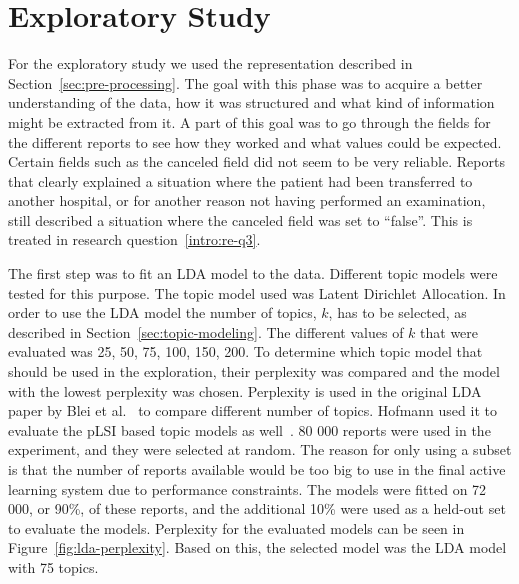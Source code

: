 \section{Exploratory Study}\label{sec:exploratory-study}

For the exploratory study we used the representation described in Section~\ref{sec:pre-processing}.
The goal with this phase was to acquire a better understanding of the data, how it was structured and what kind of information might be extracted from it.
A part of this goal was to go through the fields for the different reports to see how they worked and what values could be expected.
Certain fields such as the canceled field did not seem to be very reliable. 
Reports that clearly explained a situation where the patient had been transferred to another hospital, or for another reason not having performed an examination, still described a situation where the canceled field was set to ``false''.
This is treated in research question~\ref{intro:re-q3}.

The first step was to fit an LDA model to the data.
Different topic models were tested for this purpose.
The topic model used was Latent Dirichlet Allocation.
In order to use the LDA model the number of topics, $k$, has to be selected, as described in Section~\ref{sec:topic-modeling}.
The different values of $k$ that were evaluated was 25, 50, 75, 100, 150, 200.
To determine which topic model that should be used in the exploration, their perplexity was compared and the model with the lowest perplexity was chosen.
Perplexity is used in the original LDA paper by Blei et al\@.~\cite{blei2003latent} to compare different number of topics.
Hofmann used it to evaluate the pLSI based topic models as well~\cite{hofmann1999probabilistic}.
80 000 reports were used in the experiment, and they were selected at random.
The reason for only using a subset is that the number of reports available would be too big to use in the final active learning system due to performance constraints.
The models were fitted on 72 000, or 90\%, of these reports, and the additional 10\% were used as a held-out set to evaluate the models.
Perplexity for the evaluated models can be seen in Figure~\ref{fig:lda-perplexity}.
Based on this, the selected model was the LDA model with 75 topics.

